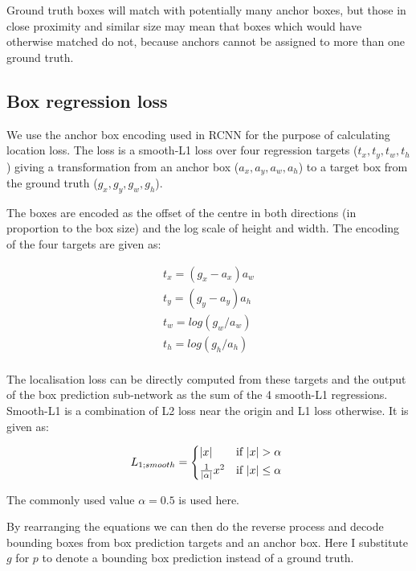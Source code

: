 Ground truth boxes will match with potentially many anchor boxes, but those in close proximity and similar size may mean that boxes which would have otherwise matched do not, because anchors cannot be assigned to more than one ground truth.

\subsection {Box regression loss}
\label{sec:regression}


We use the anchor box encoding used in \gls{RCNN} \cite{Wang2017} for the purpose of calculating location loss. The loss is a smooth-L1 loss over four regression targets ($t_x, t_y, t_w, t_h$) giving a transformation from an anchor box ($a_x, a_y, a_w, a_h$)  to a target box from the ground truth ($g_x, g_y, g_w, g_h$). 

The boxes are encoded as the offset of the centre in both directions (in proportion to the box size) and the log scale of height and width. The encoding of the four targets are given as:

\begin{equation}
\begin{split}
t_x = (g_x - a_x) a_w\\
t_y = (g_y - a_y) a_h\\
t_w = log(g_w / a_w)\\
t_h = log(g_h / a_h)\\
\end{split}
\label{eq:encoding_rcnn}
\end{equation}

The localisation loss can be directly computed from these targets and the output of the box prediction sub-network as the sum of the 4 smooth-L1 regressions. Smooth-L1 is a combination of L2 loss near the origin and L1 loss otherwise. It is given as:

\begin{equation}
L_{1;smooth} = 
\begin{cases*}
|x| & if $|x|>\alpha $ \\
\frac{1}{|\alpha|}x^2 & if $|x| \leq \alpha$
\end{cases*}
\label{eq:smooth_l1}
\end{equation}

The commonly used value $\alpha = 0.5$ is used here.

By rearranging the equations we can then do the reverse process and decode bounding boxes from box prediction targets and an anchor box. Here I substitute $ g $ for $ p $ to denote a bounding box prediction instead of a ground truth.

